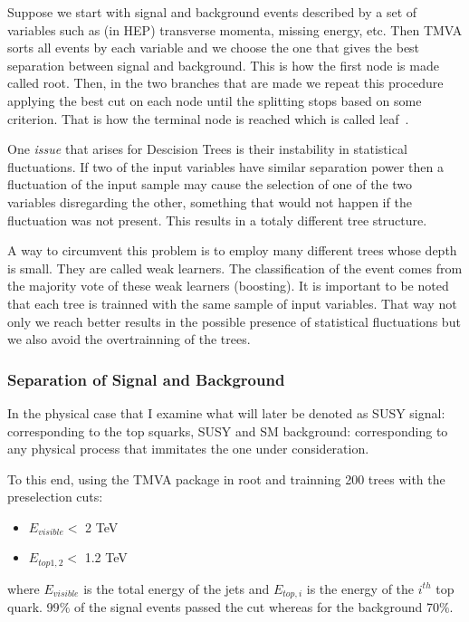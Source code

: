 \documentclass[12pt,a4paper]{report}
\begin{document}
Suppose we start with signal and background events described by a set of variables such as (in HEP) transverse 
momenta, missing energy, etc. Then TMVA sorts all events by each variable and we choose the one that gives the
best separation between signal and background. This is how the first node is made called root. Then, in the two branches 
that are made we repeat this procedure applying the best cut on each node until the splitting stops based on 
some criterion. That is how the terminal node is reached which is called leaf~\cite{hoecker2007tmva}.

One \textit{issue} that arises for Descision Trees is their instability in statistical fluctuations. If two 
of the input variables have similar separation power then a fluctuation of the input sample may cause the 
selection of one of the two variables disregarding the other, something that would not happen if the fluctuation
was not present. This results in a totaly different tree structure.

A way to circumvent this problem is to employ many different trees whose depth is small. They are called
weak learners. The classification of the event comes from the majority vote of these weak learners (boosting).
It is important to be noted that each tree is trainned with the same sample of input variables. That way not 
only we reach better results in the possible presence of statistical fluctuations but we also avoid the 
overtrainning of the trees.

\subsubsection{Separation of Signal and Background}

In the physical case that I examine what will later be denoted as SUSY signal: corresponding to the 
top squarks, SUSY and SM background: corresponding to any physical process that immitates the one under 
consideration.

To this end, using the TMVA package in root and trainning 200 trees with the  preselection cuts:

\begin{itemize}
 \item $E_{visible} <$ 2 TeV
 \item $E_{top 1,2} <$ 1.2 TeV
\end{itemize}

where $E_{visible}$ is the total energy of the jets and $E_{top,i}$ is the energy of the $i^{th}$ top quark.
99$\%$ of the signal events passed the cut whereas for the background 70$\%$.
\end{document}
